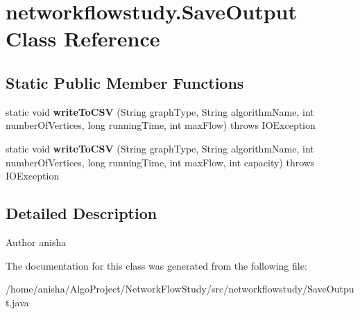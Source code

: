 \hypertarget{classnetworkflowstudy_1_1SaveOutput}{}\section{networkflowstudy.\+Save\+Output Class Reference}
\label{classnetworkflowstudy_1_1SaveOutput}
\subsection*{Static Public Member Functions}
\begin{DoxyCompactItemize}
\item 
static void {\bfseries write\+To\+C\+SV} (String graph\+Type, String algorithm\+Name, int number\+Of\+Vertices, long running\+Time, int max\+Flow)  throws I\+O\+Exception \hypertarget{classnetworkflowstudy_1_1SaveOutput_a9c8e9fa3b7f273f6b63025dd4afea9e5}{}\label{classnetworkflowstudy_1_1SaveOutput_a9c8e9fa3b7f273f6b63025dd4afea9e5}

\item 
static void {\bfseries write\+To\+C\+SV} (String graph\+Type, String algorithm\+Name, int number\+Of\+Vertices, long running\+Time, int max\+Flow, int capacity)  throws I\+O\+Exception \hypertarget{classnetworkflowstudy_1_1SaveOutput_a9004b849510ac57e5e9f4fd6dfd9308f}{}\label{classnetworkflowstudy_1_1SaveOutput_a9004b849510ac57e5e9f4fd6dfd9308f}

\end{DoxyCompactItemize}


\subsection{Detailed Description}
\begin{DoxyAuthor}{Author}
anisha 
\end{DoxyAuthor}


The documentation for this class was generated from the following file\+:\begin{DoxyCompactItemize}
\item 
/home/anisha/\+Algo\+Project/\+Network\+Flow\+Study/src/networkflowstudy/Save\+Output.\+java\end{DoxyCompactItemize}
